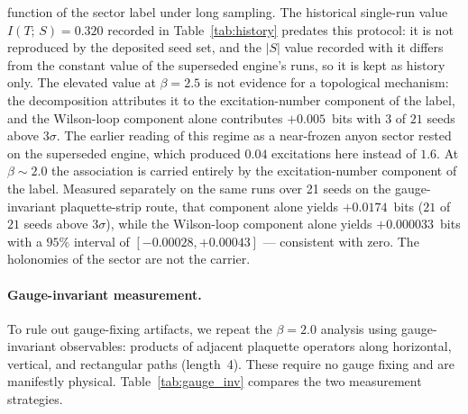 \documentclass[aps,pra,twocolumn,superscriptaddress,showpacs,floatfix]{revtex4-2}
\newcommand{\MI}{I(T;\,S)}
\begin{document}
function of the sector label under long sampling. The historical single-run
value $\MI = 0.320$ recorded in Table~\ref{tab:history} predates this protocol:
it is not reproduced by the deposited seed set, and the $|S|$ value recorded
with it differs from the constant value of the superseded engine's runs, so it is kept as history
only. The elevated
value at $\beta = 2.5$ is not evidence for a topological mechanism: the
decomposition attributes it to the excitation-number component of the label,
and the Wilson-loop component alone contributes $+0.005$~bits with $3$ of $21$
seeds above $3\sigma$. The earlier reading of this regime as a near-frozen
anyon sector rested on the superseded engine, which produced $0.04$ excitations
here instead of $1.6$. At $\beta \sim 2.0$ the association is carried entirely
by the excitation-number component of the label. Measured separately on the
same runs over 21 seeds on the gauge-invariant plaquette-strip route, that
component alone yields $+0.0174$~bits ($21$ of
$21$ seeds above $3\sigma$), while the Wilson-loop component alone yields
$+0.000033$~bits with a $95\%$ interval of $[-0.00028, +0.00043]$ ---
consistent with zero. The holonomies of the sector are not the carrier.

\paragraph{Gauge-invariant measurement.}
To rule out gauge-fixing artifacts, we repeat the $\beta = 2.0$ analysis using
gauge-invariant observables: products of adjacent plaquette operators along
horizontal, vertical, and rectangular paths (length~4). These require no gauge
fixing and are manifestly physical. Table~\ref{tab:gauge_inv} compares the two
measurement strategies.
\end{document}
